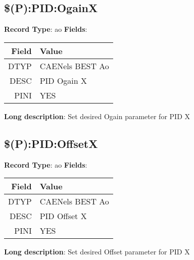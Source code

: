 \subsection{\$(P):PID:OgainX}
\textbf{Record Type}: ao \newline \newline 
\textbf{Fields}: \newline 
\begin{tabularx}{0.7\linewidth}{|r|X|}
\hline Field & Value \\
\hline
\hline
DTYP & CAENels BEST Ao\\
\hline
DESC & PID Ogain X\\
\hline
PINI & YES\\
\hline
\end{tabularx}
\newline \newline \newline
\textbf{Long description}: \newline 
 Set desired Ogain parameter for PID X
\newline \newline

\subsection{\$(P):PID:OffsetX}
\textbf{Record Type}: ao \newline \newline 
\textbf{Fields}: \newline 
\begin{tabularx}{0.7\linewidth}{|r|X|}
\hline Field & Value \\
\hline
\hline
DTYP & CAENels BEST Ao\\
\hline
DESC & PID Offset X\\
\hline
PINI & YES\\
\hline
\end{tabularx}
\newline \newline \newline
\textbf{Long description}: \newline 
 Set desired Offset parameter for PID X
\newline \newline


